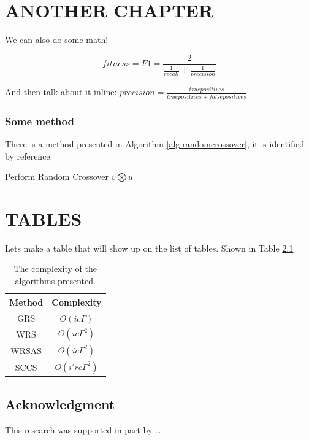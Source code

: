\documentclass [MS] {umbthes}
\begin{document}
\chapter{ANOTHER CHAPTER}

We can also do some math!

$$fitness = F1 =\frac{2}{\frac{1}{recall} + \frac{1}{precision}}$$



And then talk about it inline: $precision =\frac{true positives}{true positives
+ false positives}$

\subsection{Some method}


There is a method presented in Algorithm
\ref{alg:randomcrossover}, it is identified by reference.

\begin{algorithm}[h]
\LinesNumbered
\caption{Perform Random Crossover  $v \bigotimes u$}
\label{alg:randomcrossover}
{}

\end{algorithm}





















\chapter{TABLES}
Lets make a table that will show up on the list of tables. Shown in Table
\ref{tab:complexity}


\begin{table}[h]
\begin{center}
\begin{tabular}{|c|c|}
\hline
Method & Complexity \\
\hline
\hline
GRS & $O(ic\Gamma)$ \\
\hline
WRS & $O(ic\Gamma^2)$ \\
\hline
WRSAS & $O(ic\Gamma^2)$ \\
\hline
SCCS & $O(i'rc\Gamma^2)$ \\
\hline
\end{tabular}
\end{center}

\caption{The complexity of the algorithms presented.  }
\label{tab:complexity}
\end{table}




\section*{Acknowledgment}
This research was supported in part by \ldots



 

\end{document}
